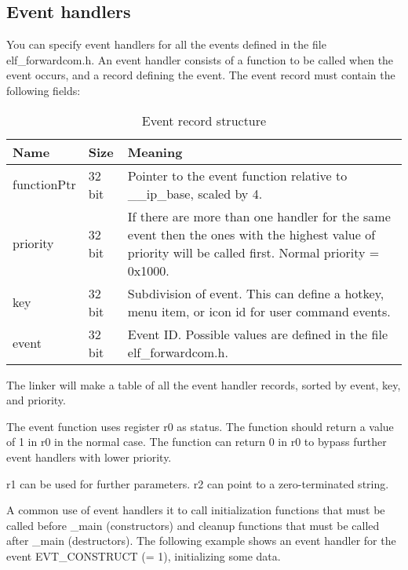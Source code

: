 \documentclass[forwardcom.tex]{subfiles}
\begin{document}
\subsection{Event handlers} \label{EventHandlers}
You can specify event handlers for all the events defined in the file elf\_forwardcom.h.
An event handler consists of a function to be called when the event occurs, and a record
defining the event. The event record must contain the following fields:

\begin{longtable} {|p{20mm}|p{15mm}|p{100mm}|}
\caption{Event record structure} 
\label{table:EventRecordStructure}\\
\endfirsthead
\endhead
\hline
\bfseries Name & \bfseries Size & \bfseries Meaning  \\
\hline
functionPtr & 32 bit & Pointer to the event function relative to \_\_ip\_base, scaled by 4.\\
\hline
priority    & 32 bit & If there are more than one handler for the same event then the ones with
the highest value of priority will be called first. 
Normal priority = 0x1000.\\
\hline
key         & 32 bit & Subdivision of event. This can define a hotkey, menu item, or icon id for user command events.\\
\hline
event       & 32 bit & Event ID. Possible values are defined in the file \newline elf\_forwardcom.h.\\
\hline
\end{longtable}
\vv

The linker will make a table of all the event handler records, sorted by event, key, and priority.
\vv

The event function uses register r0 as status. The function should 
return a value of 1 in r0 in the normal case. The function can return 0 in r0 to bypass further 
event handlers with lower priority.
\vv

r1 can be used for further parameters. r2 can point to a zero-terminated string.
\vv

A common use of event handlers it to call initialization functions that must be called before \_main (constructors) and cleanup functions that must be called after \_main (destructors). 
The following example shows an event handler for the event EVT\_CONSTRUCT (= 1), initializing some data.
\end{document}
